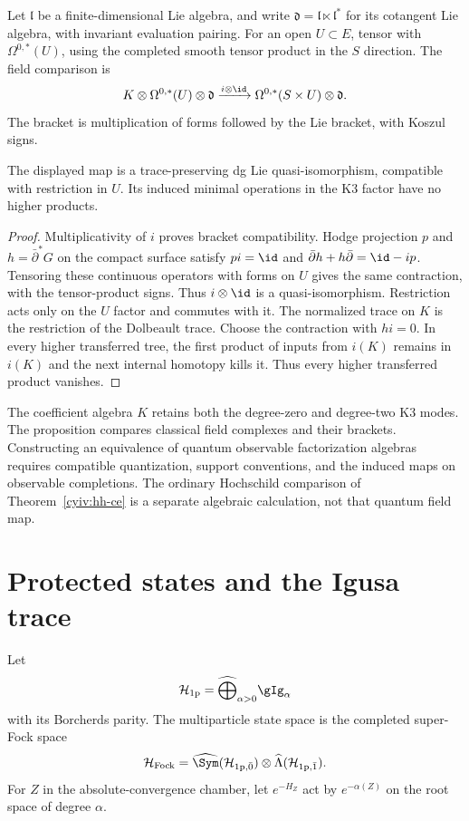 Let $\mathfrak l$ be a finite-dimensional Lie algebra, and write
$\mathfrak d=\mathfrak l\ltimes\mathfrak l^*$ for its cotangent Lie
algebra, with invariant evaluation pairing.
For an open $U\subset E$, tensor with $\Omega^{0,*}(U)$, using the
completed smooth tensor product in the $S$ direction.
The field comparison is
\[
 K\otimes\Omega^{0,*}(U)\otimes\mathfrak d
 \xrightarrow{i\otimes\id}
 \Omega^{0,*}(S\times U)\otimes\mathfrak d.
\]
The bracket is multiplication of forms followed by the Lie bracket,
with Koszul signs.

\begin{proposition}\label{cyiv:k3-classical-reduction}
The displayed map is a trace-preserving dg Lie quasi-isomorphism,
compatible with restriction in $U$.
Its induced minimal operations in the K3 factor have no higher products.
\end{proposition}
\begin{proof}
Multiplicativity of $i$ proves bracket compatibility.
Hodge projection $p$ and $h=\bar\partial^*G$ on the compact surface satisfy
$pi=\id$ and $\bar\partial h+h\bar\partial=\id-ip$.
Tensoring these continuous operators with forms on $U$ gives the same
contraction, with the tensor-product signs.
Thus $i\otimes\id$ is a quasi-isomorphism.
Restriction acts only on the $U$ factor and commutes with it.
The normalized trace on $K$ is the restriction of the Dolbeault trace.
Choose the contraction with $hi=0$.
In every higher transferred tree, the first product of inputs from
$i(K)$ remains in $i(K)$ and the next internal homotopy kills it.
Thus every higher transferred product vanishes.
\end{proof}

The coefficient algebra $K$ retains both the degree-zero and degree-two
K3 modes.
The proposition compares classical field complexes and their brackets.
Constructing an equivalence of quantum observable factorization algebras
requires compatible quantization, support conventions, and the induced
maps on observable completions.
The ordinary Hochschild comparison of Theorem~\ref{cyiv:hh-ce} is a
separate algebraic calculation, not that quantum field map.

\chapter{Protected states and the Igusa trace}
Let
\[
 \mathcal H_{\mathrm{1p}}
 =\widehat\bigoplus_{\alpha>0}\gIg_\alpha
\]
with its Borcherds parity.  The multiparticle state space is the completed super-Fock space
\[
 \mathcal H_{\mathrm{Fock}}=\widehat\Sym(\mathcal H_{\mathrm{1p},\bar0})
 \tensor\widehat\Lambda(\mathcal H_{\mathrm{1p},\bar1}).
\]
For $Z$ in the absolute-convergence chamber, let $e^{-H_Z}$ act by $e^{-\alpha(Z)}$ on the root space of degree $\alpha$.

